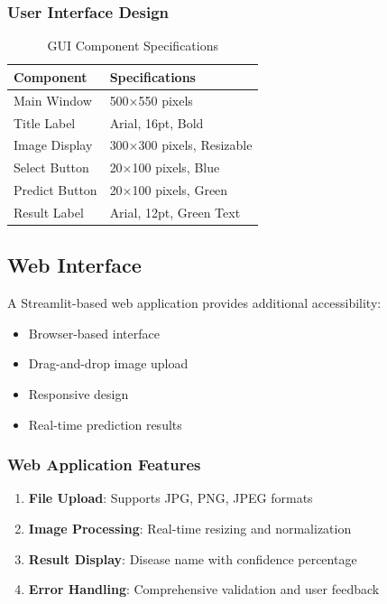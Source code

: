 \documentclass[conference,10pt,letterpaper]{IEEEtran}
\begin{document}
\subsubsection{User Interface Design}
\begin{table}[htbp]
\centering
\caption{GUI Component Specifications}
\label{tab:gui_components}
\begin{tabular}{ll}
\toprule
Component & Specifications \\
\midrule
Main Window & 500×550 pixels \\
Title Label & Arial, 16pt, Bold \\
Image Display & 300×300 pixels, Resizable \\
Select Button & 20×100 pixels, Blue \\
Predict Button & 20×100 pixels, Green \\
Result Label & Arial, 12pt, Green Text \\
\bottomrule
\end{tabular}
\end{table}

\subsection{Web Interface}

A Streamlit-based web application provides additional accessibility:
\begin{itemize}
\item Browser-based interface
\item Drag-and-drop image upload
\item Responsive design
\item Real-time prediction results
\end{itemize}

\subsubsection{Web Application Features}
\begin{enumerate}
\item \textbf{File Upload}: Supports JPG, PNG, JPEG formats
\item \textbf{Image Processing}: Real-time resizing and normalization
\item \textbf{Result Display}: Disease name with confidence percentage
\item \textbf{Error Handling}: Comprehensive validation and user feedback
\end{enumerate}
\end{document}
